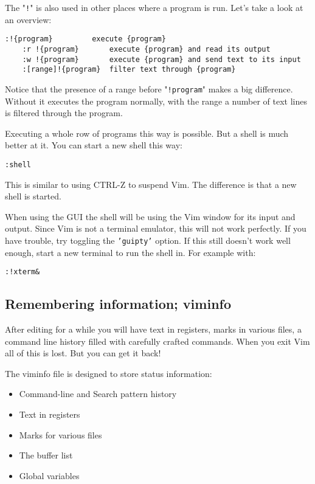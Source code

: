 The "\texttt{!}" is also used in other places where a program is run.
Let's take a look at an overview:

\begin{Verbatim}[samepage=true]
    :!{program}     	execute {program}
    :r !{program}      	execute {program} and read its output
    :w !{program}     	execute {program} and send text to its input
    :[range]!{program}  filter text through {program}
\end{Verbatim}

Notice that the presence of a range before "\texttt{!{program}}" makes a big difference.
Without it executes the program normally, with the range a number of text lines is filtered through the program.

Executing a whole row of programs this way is possible.
But a shell is much better at it.
You can start a new shell this way:

\begin{Verbatim}[samepage=true]
 :shell
\end{Verbatim}

This is similar to using CTRL-Z to suspend Vim.
The difference is that a new shell is started.

When using the GUI the shell will be using the Vim window for its input and output.
Since Vim is not a terminal emulator, this will not work perfectly.
If you have trouble, try toggling the \texttt{'guipty'} option.
If this still doesn't work well enough, start a new terminal to run the shell in.
For example with:

\begin{Verbatim}[samepage=true]
 :!xterm&
\end{Verbatim}
\subsection{Remembering information; viminfo}
After editing for a while you will have text in registers, marks in various files, a command line history filled with carefully crafted commands.
When you exit Vim all of this is lost.
But you can get it back!

The viminfo file is designed to store status information:
\begin{itemize}
\item Command-line and Search pattern history
\item Text in registers
\item Marks for various files
\item The buffer list
\item Global variables
\end{itemize}

